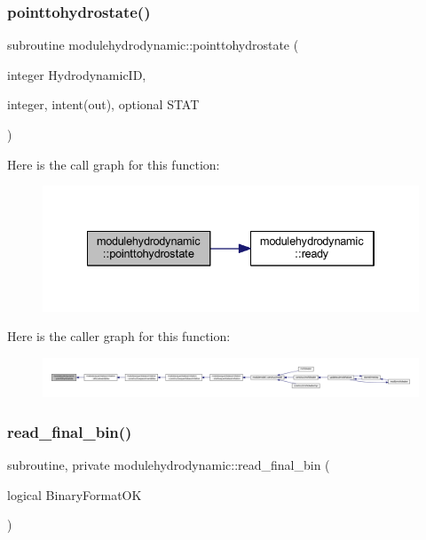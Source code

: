 \subsubsection{\texorpdfstring{pointtohydrostate()}{pointtohydrostate()}}
{\footnotesize\ttfamily subroutine modulehydrodynamic\+::pointtohydrostate (\begin{DoxyParamCaption}\item[{integer}]{Hydrodynamic\+ID,  }\item[{integer, intent(out), optional}]{S\+T\+AT }\end{DoxyParamCaption})\hspace{0.3cm}{\ttfamily [private]}}

Here is the call graph for this function\+:\nopagebreak
\begin{figure}[H]
\begin{center}
\leavevmode
\includegraphics[width=334pt]{namespacemodulehydrodynamic_a132ea2e90b030b8a52c174eec61093e2_cgraph}
\end{center}
\end{figure}
Here is the caller graph for this function\+:\nopagebreak
\begin{figure}[H]
\begin{center}
\leavevmode
\includegraphics[width=350pt]{namespacemodulehydrodynamic_a132ea2e90b030b8a52c174eec61093e2_icgraph}
\end{center}
\end{figure}
\mbox{\label{namespacemodulehydrodynamic_a24c75082fcb309f40ebc8ab0a0493fc8}} 
\subsubsection{\texorpdfstring{read\+\_\+final\+\_\+bin()}{read\_final\_bin()}}
{\footnotesize\ttfamily subroutine, private modulehydrodynamic\+::read\+\_\+final\+\_\+bin (\begin{DoxyParamCaption}\item[{logical}]{Binary\+Format\+OK }\end{DoxyParamCaption})\hspace{0.3cm}{\ttfamily [private]}}

